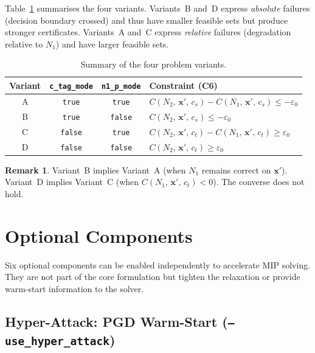 \documentclass[11pt,a4paper]{article}
\theoremstyle{definition}
\newtheorem{remark}{Remark}[section]
\theoremstyle{plain}
\newcommand{\Conf}[3]{C(#1,\,#2,\,#3)}
\newcommand{\NN}[1]{N_{#1}}
\newcommand{\vxp}{\mathbf{x}'}
\newcommand{\epszero}{\varepsilon_0}
\begin{document}
Table~\ref{tab:variants} summarises the four variants. Variants~B and~D express \emph{absolute} failures (decision boundary crossed) and thus have smaller feasible sets but produce stronger certificates. Variants~A and~C express \emph{relative} failures (degradation relative to $\NN{1}$) and have larger feasible sets.

\begin{table}[h]
\centering
\caption{Summary of the four problem variants.}
\label{tab:variants}
\begin{tabular}{ccc p{5.8cm}}
\toprule
\textbf{Variant} & \textbf{\texttt{c\_tag\_mode}} & \textbf{\texttt{n1\_p\_mode}} & \textbf{Constraint (C6)} \\
\midrule
A & \texttt{true}  & \texttt{true}  & $\Conf{\NN{2}}{\vxp}{c_s} - \Conf{\NN{1}}{\vxp}{c_s} \le -\epszero$ \\[4pt]
B & \texttt{true}  & \texttt{false} & $\Conf{\NN{2}}{\vxp}{c_s} \le -\epszero$ \\[4pt]
C & \texttt{false} & \texttt{true}  & $\Conf{\NN{2}}{\vxp}{c_t} - \Conf{\NN{1}}{\vxp}{c_t} \ge \epszero$ \\[4pt]
D & \texttt{false} & \texttt{false} & $\Conf{\NN{2}}{\vxp}{c_t} \ge \epszero$ \\
\bottomrule
\end{tabular}
\end{table}

\begin{remark}
Variant~B implies Variant~A (when $\NN{1}$ remains correct on $\vxp$). Variant~D implies Variant~C (when $\Conf{\NN{1}}{\vxp}{c_t} < 0$). The converse does not hold.
\end{remark}

\section{Optional Components}
\label{sec:components}

Six optional components can be enabled independently to accelerate MIP solving. They are not part of the core formulation but tighten the relaxation or provide warm-start information to the solver.

\subsection{Hyper-Attack: PGD Warm-Start (\texttt{--use\_hyper\_attack})}
\label{sec:hyperattack}
\end{document}

